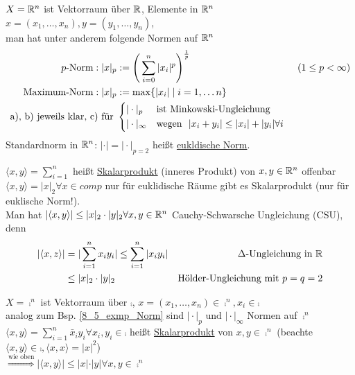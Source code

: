 \begin{exmpn}\label{8_5_exmp_Norm}
    $X=\mathbb{R}^n$ ist Vektorraum über $\mathbb{R}$, Elemente in $\mathbb{R}^n$\\ $x=(x_1,\dots,x_n), y=(y_1, \dots, y_n)$,\\ man hat unter anderem folgende Normen auf $\mathbb{R}^n$
    \begin{align*}
        p\text{-Norm}: \vert x \vert_p& := \Bigg( \sum_{i=0}^{n} \vert x_i \vert^p \Bigg)^{\frac{1}{p}} & (1\leq p < \infty)\\
        \text{Maximum-Norm}: \vert x \vert_p& := \max\{\vert x_i \vert \mid i=1,\dots n\} &\\
        \text{a), b) jeweils klar, c) für } & 
        \begin{cases*}
            \vert \cdot \vert_p & \text{ist Minkowski-Ungleichung}\\
            \vert \cdot \vert_{\infty} & \text{wegen } $\vert x_i + y_i \vert \leq \vert x_i \vert + \vert y_i \vert \forall i$
        \end{cases*}
    \end{align*}
    Standardnorm in $\mathbb{R}^n$:
	$\vert \cdot \vert = \vert \cdot \vert_{p=2}$ heißt \underline{eukldische Norm}.\\
\end{exmpn}

\begin{mydefn}[Skalarprodukt]
    $\langle x,y \rangle = \sum_{i=1}^{n}$ heißt \underline{Skalarprodukt} (inneres Produkt) von $x,y \in \mathbb{R}^n$ offenbar $\langle x,y \rangle = \vert x \vert_2 \forall x \in comp$ nur für euklidische Räume gibt es Skalarprodukt (nur für euklische Norm!).\\
    Man hat $\vert \langle x,y\rangle \vert \leq \vert x \vert_2 \cdot \vert y \vert_2 \forall x,y \in \mathbb{R}^n$ Cauchy-Schwarsche Ungleichung (CSU), denn
    \begin{align*}
        \vert \langle x,z \rangle \vert &= \vert \sum_{i=1}^{n} x_i y_i \vert \leq  \sum_{i=1}^{n}\vert x_i y_i\vert & \Delta\text{-Ungleichung in } \mathbb{R}\\
        & \leq \vert x \vert_2 \cdot\vert y \vert_2 & \text{Hölder-Ungleichung mit } p=q=2
    \end{align*}
\end{mydefn}

\begin{exmpn}
	$X=\comp^n$ ist Vektorraum über $\comp$, $x=(x_1,\dots,x_n) \in\comp^n, x_i \in \comp$\\
    analog zum Bsp. \ref{8_5_exmp_Norm} sind $\vert \cdot \vert_{p} \text{ und } \vert \cdot \vert_{\infty}$ Normen auf $\comp^n$\\
    $\langle x,y\rangle = \sum_{i=1}^{n} \bar{x}_i y_i\forall x_i, y_i \in \comp$ heißt \underline{Skalarprodukt} von $x,y \in \comp^n$ (beachte $\langle x,y\rangle \in \comp, \langle x,x \rangle=\vert x \vert^2$) \\
    $\overset{\text{wie oben}}{\Rightarrow} \vert \langle x,y\rangle \vert \leq \vert x \vert\cdot \vert y \vert \forall x,y \in \comp^n$
\end{exmpn}

